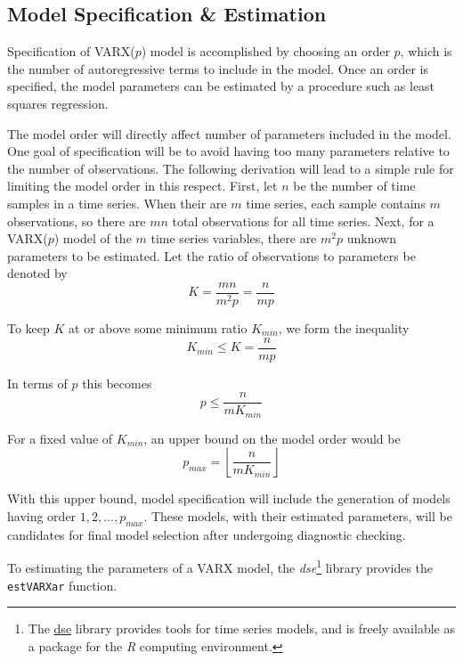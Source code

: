 \documentclass[a4paper]{scrartcl}
\begin{document}
\subsection*{Model Specification \& Estimation}
Specification of VARX($p$) model is accomplished by choosing an order $p$, which is the number of autoregressive terms to include in the model. Once an order is specified, the model parameters can be estimated by a procedure such as least squares regression.  

The model order will directly affect number of parameters included in the model. One goal of specification will be to avoid having too many parameters relative to the number of observations. The following derivation will lead to a simple rule for limiting the model order in this respect. First, let $n$ be the number of time samples in a time series. When their are $m$ time series, each sample contains $m$ observations, so there are $m n$ total observations for all time series. Next, for a VARX($p$) model of the $m$ time series variables, there are $m^2 p$ unknown parameters to be estimated. Let the ratio of observations to parameters be denoted by
\begin{equation}
K = \frac{m n}{m^2 p} = \frac{n}{m p}
\end{equation}

To keep $K$ at or above some minimum ratio $K_{min}$, we form the inequality
\begin{equation}
K_{min} \leq K = \frac{n}{m p}
\end{equation}

In terms of $p$ this becomes
\begin{equation}
p \le \frac{n}{m K_{min}}
\end{equation}

For a fixed value of $K_{min}$, an upper bound on the model order would be
\begin{equation}
p_{max} = \left \lfloor \frac{n}{m K_{min}} \right \rfloor
\end{equation}

With this upper bound, model specification will include the generation of models having order $1, 2,..., p_{max}$. These models, with their estimated parameters, will be candidates for final model selection after undergoing diagnostic checking.

To estimating the parameters of a VARX model, the \textit{dse}\footnote{The \href{http://cran.r-project.org/web/packages/dse}{dse} library provides tools for time series models, and is freely available as a package for the \textit{R} computing environment.} library provides the \texttt{estVARXar} function.
\end{document}
